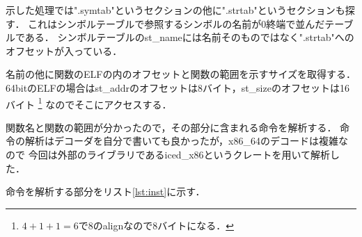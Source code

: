 \documentclass[12pt,a4paper,dvipdfmx]{jsarticle}
\begin{document}
示した処理では".symtab"というセクションの他に".strtab"というセクションも探す．
これはシンボルテーブルで参照するシンボルの名前が0終端で並んだテーブルである．
シンボルテーブルのst\_nameには名前そのものではなく".strtab"へのオフセットが入っている．

名前の他に関数のELFの内のオフセットと関数の範囲を示すサイズを取得する．
64bitのELFの場合はst\_addrのオフセットは8バイト，st\_sizeのオフセットは16バイト
\footnote{$4+1+1=6$で8のalignなので8バイトになる．}
なのでそこにアクセスする\cite{sym}．

関数名と関数の範囲が分かったので，その部分に含まれる命令を解析する．
命令の解析はデコーダを自分で書いても良かったが，x86\_64のデコードは複雑なので
今回は外部のライブラリであるiced\_x86\cite{iced}というクレートを用いて解析した．

命令を解析する部分をリスト\ref{lst:inst}に示す．
\end{document}
